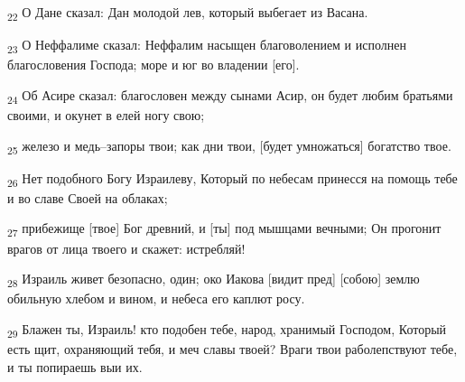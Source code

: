 \begin{tcolorbox}
\textsubscript{22} О Дане сказал: Дан молодой лев, который выбегает из Васана.
\end{tcolorbox}
\begin{tcolorbox}
\textsubscript{23} О Неффалиме сказал: Неффалим насыщен благоволением и исполнен благословения Господа; море и юг во владении [его].
\end{tcolorbox}
\begin{tcolorbox}
\textsubscript{24} Об Асире сказал: благословен между сынами Асир, он будет любим братьями своими, и окунет в елей ногу свою;
\end{tcolorbox}
\begin{tcolorbox}
\textsubscript{25} железо и медь--запоры твои; как дни твои, [будет умножаться] богатство твое.
\end{tcolorbox}
\begin{tcolorbox}
\textsubscript{26} Нет подобного Богу Израилеву, Который по небесам принесся на помощь тебе и во славе Своей на облаках;
\end{tcolorbox}
\begin{tcolorbox}
\textsubscript{27} прибежище [твое] Бог древний, и [ты] под мышцами вечными; Он прогонит врагов от лица твоего и скажет: истребляй!
\end{tcolorbox}
\begin{tcolorbox}
\textsubscript{28} Израиль живет безопасно, один; око Иакова [видит пред] [собою] землю обильную хлебом и вином, и небеса его каплют росу.
\end{tcolorbox}
\begin{tcolorbox}
\textsubscript{29} Блажен ты, Израиль! кто подобен тебе, народ, хранимый Господом, Который есть щит, охраняющий тебя, и меч славы твоей? Враги твои раболепствуют тебе, и ты попираешь выи их.
\end{tcolorbox}
